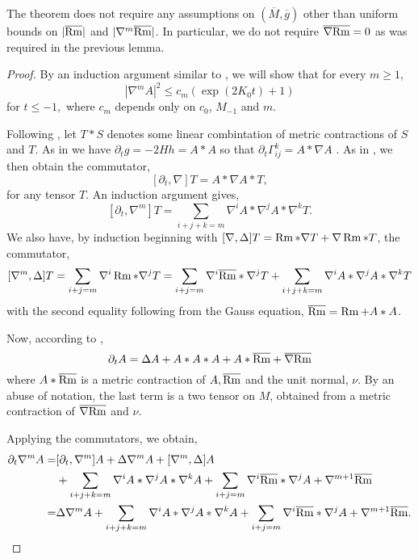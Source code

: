 \documentclass{amsart}
\begin{document}
\begin{rem}
The theorem does not require any assumptions on \((\overline{M}, \overline{g})\) other than uniform bounds on \(|\overline{\operatorname{Rm}}|\) and \(|\nabla^m \overline{\operatorname{Rm}}|\). In particular, we do not require \(\overline{\nabla} \overline{\operatorname{Rm}} = 0\) as was required in the previous lemma.
\end{rem}

\begin{proof}
By an induction argument similar to \cite{Hamilton:/1995a}, we will show that for every \(m \geq 1\),
\begin{equation}
\label{eq:higher_derivative_bounds}
|\nabla^mA|^2 \leq c_m (\exp(2K_0t) + 1)
\end{equation}
for $t\le -1,$ where $c_m$ depends only on $c_0$, $M_{-1}$ and $m$.

Following \cite{Hamilton:/1982}, let \(T \ast S\) denotes some linear combintation of metric contractions of \(S\) and \(T\). As in \cite[3.3 Corollary (i)]{Huisken:/1986} we have \(\partial_t g = -2Hh = A \ast A\) so that \(\partial_t\Gamma_{ij}^k = A\ast\nabla A\) \cite[Section 7]{Huisken:/1984}. As in \cite[Section 13]{Hamilton:/1982}, we then obtain the commutator,
\[
[\partial_t, \nabla] T = A \ast \nabla A \ast T,
\]
for any tensor \(T\). An induction argument gives,
\[
[\partial_t, \nabla^m] T = \sum_{i+j+k=m} \nabla^i A \ast \nabla^j A \ast \nabla^k T.
\]
We also have, by induction beginning with \([\nabla, \Delta]T = \operatorname{Rm} \ast \nabla T + \nabla \operatorname{Rm} \ast T\), the commutator,
\[
[\nabla^m, \Delta] T = \sum\limits_{i+j=m} \nabla^i \operatorname{Rm} \ast \nabla^j T = \sum\limits_{i+j=m} \nabla^i \overline{\operatorname{Rm}} \ast \nabla^j T + \sum\limits_{i+j+k=m} \nabla^i A \ast \nabla^j A \ast \nabla^k T
\]
with the second equality following from the Gauss equation, \(\overline{\operatorname{Rm}} = \operatorname{Rm} + A \ast A\).

Now, according to \cite[3.3 Corollary (i)]{Huisken:/1986},
\[
\partial_t A = \Delta A + A \ast A \ast A + A \ast \overline{\operatorname{Rm}} + \overline{\nabla} \overline{\operatorname{Rm}}
\]
where \(A \ast \overline{\operatorname{Rm}}\) is a metric contraction of \(A, \overline{\operatorname{Rm}}\) and the unit normal, \(\nu\). By an abuse of notation, the last term is a two tensor on \(M\), obtained from a metric contraction of \(\overline{\nabla} \overline{\operatorname{Rm}}\) and \(\nu\).

Applying the commutators, we obtain,
\[
\begin{split}
\partial_t \nabla^m A =& [\partial_t, \nabla^m] A + \Delta \nabla^m A + [\nabla^m , \Delta] A \\
& + \sum_{i+j+k=m} \nabla^i A \ast \nabla^j A \ast \nabla^k A + \sum_{i+j=m} \nabla^i \overline{\operatorname{Rm}} \ast \nabla^j A + \nabla^{m+1} \overline{\operatorname{Rm}} \\
=& \Delta \nabla^m A + \sum_{i+j+k=m} \nabla^i A \ast \nabla^j A \ast \nabla^k A + \sum_{i+j=m} \nabla^i \overline{\operatorname{Rm}} \ast \nabla^j A + \nabla^{m+1} \overline{\operatorname{Rm}}.
\end{split}
\]


\end{proof}
\end{document}
